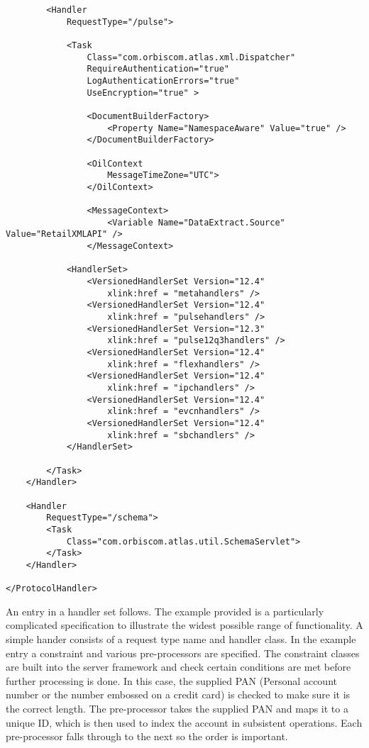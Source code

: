 \documentclass[a4paper, 11pt, titlepage]{article}
\begin{document}
\begin{itemize}
\begin{verbatim}
		<Handler 
			RequestType="/pulse"> 
 
			<Task 
				Class="com.orbiscom.atlas.xml.Dispatcher" 
				RequireAuthentication="true" 
				LogAuthenticationErrors="true" 
				UseEncryption="true" > 
 
				<DocumentBuilderFactory> 
					<Property Name="NamespaceAware" Value="true" /> 
				</DocumentBuilderFactory> 
 
				<OilContext 
					MessageTimeZone="UTC"> 
				</OilContext> 
 
				<MessageContext> 
					<Variable Name="DataExtract.Source" Value="RetailXMLAPI" /> 
				</MessageContext> 
 
			<HandlerSet> 
                <VersionedHandlerSet Version="12.4" 
                    xlink:href = "metahandlers" /> 
                <VersionedHandlerSet Version="12.4" 
                    xlink:href = "pulsehandlers" /> 
                <VersionedHandlerSet Version="12.3" 
                    xlink:href = "pulse12q3handlers" /> 
                <VersionedHandlerSet Version="12.4" 
                    xlink:href = "flexhandlers" /> 
		        <VersionedHandlerSet Version="12.4" 
		            xlink:href = "ipchandlers" /> 
                <VersionedHandlerSet Version="12.4" 
                    xlink:href = "evcnhandlers" /> 
                <VersionedHandlerSet Version="12.4" 
                    xlink:href = "sbchandlers" /> 
            </HandlerSet> 
 
        </Task> 
    </Handler> 
 
    <Handler 
        RequestType="/schema"> 
        <Task 
            Class="com.orbiscom.atlas.util.SchemaServlet"> 
        </Task> 
    </Handler> 
 
</ProtocolHandler> 
\end{verbatim} 
\label{handlerset} 
An entry in a handler set follows. The example provided is a particularly complicated specification to illustrate the widest possible range of functionality. A simple hander consists of a request type name and handler class. In the example entry a constraint and various pre-processors are specified. The constraint classes are built into the server framework and check certain conditions are met before further processing is done. In this case, the supplied PAN (Personal account number or the number embossed on a credit card) is checked to make sure it is the correct length. The pre-processor takes the supplied PAN and maps it to a unique ID, which is then used to index the account in subsistent operations. Each pre-processor falls through to the next so the order is important. 
 

\end{itemize}
\end{document}
